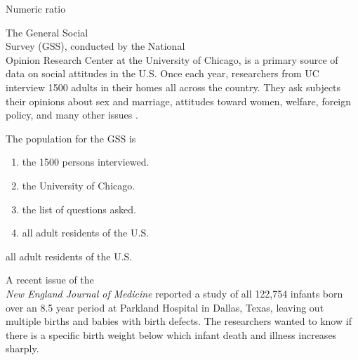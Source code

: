\documentclass[11pt]{book}\usepackage[]{graphicx}\usepackage[]{color}
\begin{document}
\begin{exercises}
\begin{exercise}
    \vspace{4mm}


  \end{exercise}
  \vspace{2mm}
  \begin{solution}   %

    Numeric  ratio

  \end{solution}

	\begin{exercise}  %

	  The General Social \\ Survey (GSS), conducted by the National \\ Opinion Research Center at the University of Chicago, is a primary source of data on social attitudes in the U.S.  Once each year, researchers from UC interview 1500 adults in their homes all across the country.  They ask subjects their opinions about sex and marriage, attitudes toward women, welfare, foreign policy, and many other issues \cite{GSS2014}.

    The population for the GSS is
    \begin{enumerate}
    \item the 1500 persons interviewed.
    \item the University of Chicago.
    \item the list of questions asked.
    \item all adult residents of the U.S.
    \end{enumerate}
    \vspace{3mm}

  \end{exercise}
  \vspace{2mm}
  \begin{solution}   %

    all adult residents of the U.S.
  \end{solution}

\begin{exercise}  %

	  A recent issue of the \\ \emph{New England Journal of Medicine} reported a study of all 122,754 infants born over an 8.5 year period at Parkland Hospital in Dallas, Texas, leaving out multiple births and babies with birth defects.  The researchers  wanted to  know if there is a specific birth weight below which infant death and illness increases sharply.


\end{exercise}
\end{exercises}
\end{document}
